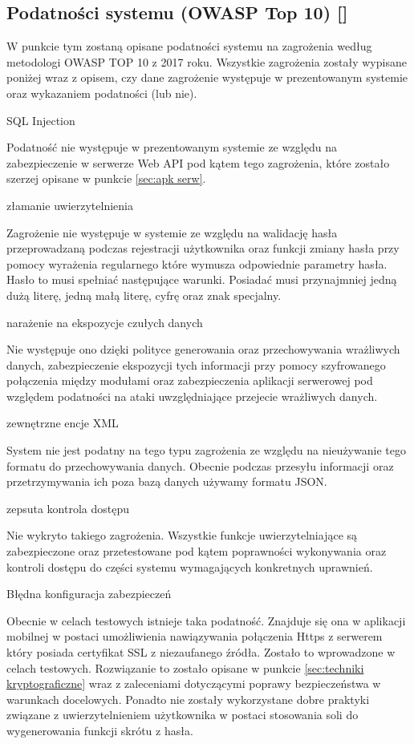 \subsection{Podatności systemu (OWASP Top 10) [\StudentA]} \label{sec:OWASP}
W punkcie tym zostaną opisane podatności systemu na zagrożenia według metodologi OWASP TOP 10 z 2017 roku. Wszystkie zagrożenia zostały wypisane poniżej wraz z opisem, czy dane zagrożenie występuje w prezentowanym systemie oraz wykazaniem podatności (lub nie).
\begin{enumerate*}
	\item SQL Injection 
	
	 Podatność nie występuje w prezentowanym systemie ze względu na zabezpieczenie w serwerze Web API pod kątem tego zagrożenia, które zostało szerzej opisane w punkcie \ref{sec:apk serw}.
	\item złamanie uwierzytelnienia 
	
	 Zagrożenie nie występuje w systemie ze względu na walidację hasła przeprowadzaną podczas rejestracji użytkownika oraz funkcji zmiany hasła przy pomocy wyrażenia regularnego które wymusza odpowiednie parametry hasła. Hasło to musi spełniać następujące warunki. Posiadać musi przynajmniej jedną dużą literę, jedną małą literę,  cyfrę oraz znak specjalny.
	\item narażenie na ekspozycje czułych danych 
	
	 Nie występuje ono dzięki polityce generowania oraz przechowywania wrażliwych danych,  zabezpieczenie ekspozycji tych informacji przy pomocy szyfrowanego połączenia między modułami oraz zabezpieczenia aplikacji serwerowej pod względem podatności na ataki uwzględniające przejecie wrażliwych danych.
	\item zewnętrzne encje XML 
	
	 System \NazwaSys \space nie jest podatny na tego typu zagrożenia ze względu na nieużywanie tego formatu do przechowywania danych. Obecnie podczas przesyłu informacji oraz przetrzymywania ich poza bazą danych używamy formatu JSON.
	\item zepsuta kontrola dostępu 
	
	 Nie wykryto takiego zagrożenia. Wszystkie funkcje uwierzytelniające są zabezpieczone oraz przetestowane pod kątem poprawności wykonywania oraz kontroli dostępu do części systemu wymagających konkretnych uprawnień.
	 \item Błędna konfiguracja zabezpieczeń
	 
	 Obecnie w celach testowych istnieje taka podatność. Znajduje się ona w aplikacji mobilnej w  postaci umożliwienia nawiązywania połączenia Https z serwerem który posiada certyfikat SSL z niezaufanego źródła. Zostało to wprowadzone w celach testowych. Rozwiązanie to zostało opisane w punkcie \ref{sec:techniki kryptograficzne} wraz z zaleceniami dotyczącymi poprawy bezpieczeństwa w warunkach docelowych. Ponadto nie zostały wykorzystane dobre praktyki związane z uwierzytelnieniem użytkownika w postaci stosowania soli do wygenerowania funkcji skrótu z hasła.
	 

\end{enumerate*}
